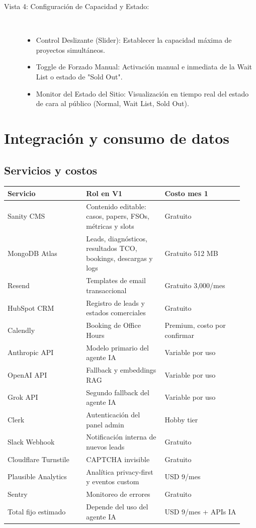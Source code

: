 \documentclass[11pt,letterpaper]{article}
\begin{document}
\begin{description}
\item[Vista 4: Configuración de Capacidad y Estado:] \ 
  \begin{itemize}
  \item Control Deslizante (Slider): Establecer la capacidad máxima de proyectos simultáneos.
  \item Toggle de Forzado Manual: Activación manual e inmediata de la Wait List o estado de "Sold Out".
  \item Monitor del Estado del Sitio: Visualización en tiempo real del estado de cara al público (Normal, Wait List, Sold Out).
  \end{itemize}
\end{description}

\section{Integración y consumo de datos}

\subsection{Servicios y costos}

\begin{longtable}{p{0.31\linewidth}p{0.31\linewidth}p{0.31\linewidth}}
\toprule
\textbf{Servicio} & \textbf{Rol en V1} & \textbf{Costo mes 1} \\
\midrule
Sanity CMS & Contenido editable: casos, papers, FSOs, métricas y slots & Gratuito \\
MongoDB Atlas & Leads, diagnósticos, resultados TCO, bookings, descargas y logs & Gratuito 512 MB \\
Resend & Templates de email transaccional & Gratuito 3,000/mes \\
HubSpot CRM & Registro de leads y estados comerciales & Gratuito \\
Calendly & Booking de Office Hours & Premium, costo por confirmar \\
Anthropic API & Modelo primario del agente IA & Variable por uso \\
OpenAI API & Fallback y embeddings RAG & Variable por uso \\
Grok API & Segundo fallback del agente IA & Variable por uso \\
Clerk & Autenticación del panel admin & Hobby tier \\
Slack Webhook & Notificación interna de nuevos leads & Gratuito \\
Cloudflare Turnstile & CAPTCHA invisible & Gratuito \\
Plausible Analytics & Analítica privacy-first y eventos custom & USD 9/mes \\
Sentry & Monitoreo de errores & Gratuito \\
Total fijo estimado & Depende del uso del agente IA & USD 9/mes + APIs IA \\
\bottomrule
\end{longtable}
\end{document}
